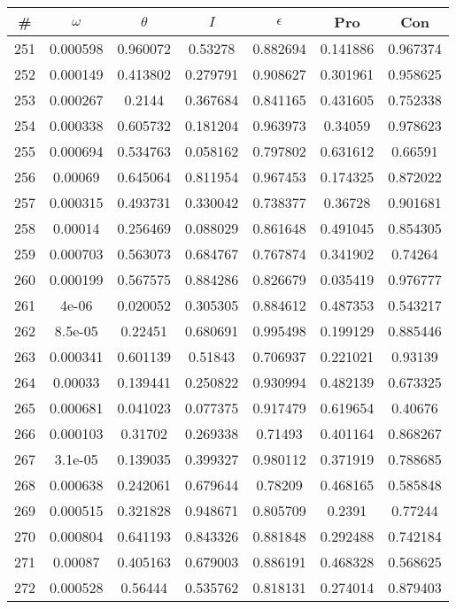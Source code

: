 \newpage
\begin{table}
\begin{tabular}{c|c|c|c|c|c|c}
\# & $\omega$ & $\theta$ & $I$ & $\epsilon$ & Pro & Con\\
\hline
251 & 0.000598 & 0.960072 & 0.53278 & 0.882694 & 0.141886 & 0.967374\\
252 & 0.000149 & 0.413802 & 0.279791 & 0.908627 & 0.301961 & 0.958625\\
253 & 0.000267 & 0.2144 & 0.367684 & 0.841165 & 0.431605 & 0.752338\\
254 & 0.000338 & 0.605732 & 0.181204 & 0.963973 & 0.34059 & 0.978623\\
255 & 0.000694 & 0.534763 & 0.058162 & 0.797802 & 0.631612 & 0.66591\\
256 & 0.00069 & 0.645064 & 0.811954 & 0.967453 & 0.174325 & 0.872022\\
257 & 0.000315 & 0.493731 & 0.330042 & 0.738377 & 0.36728 & 0.901681\\
258 & 0.00014 & 0.256469 & 0.088029 & 0.861648 & 0.491045 & 0.854305\\
259 & 0.000703 & 0.563073 & 0.684767 & 0.767874 & 0.341902 & 0.74264\\
260 & 0.000199 & 0.567575 & 0.884286 & 0.826679 & 0.035419 & 0.976777\\
261 & 4e-06 & 0.020052 & 0.305305 & 0.884612 & 0.487353 & 0.543217\\
262 & 8.5e-05 & 0.22451 & 0.680691 & 0.995498 & 0.199129 & 0.885446\\
263 & 0.000341 & 0.601139 & 0.51843 & 0.706937 & 0.221021 & 0.93139\\
264 & 0.00033 & 0.139441 & 0.250822 & 0.930994 & 0.482139 & 0.673325\\
265 & 0.000681 & 0.041023 & 0.077375 & 0.917479 & 0.619654 & 0.40676\\
266 & 0.000103 & 0.31702 & 0.269338 & 0.71493 & 0.401164 & 0.868267\\
267 & 3.1e-05 & 0.139035 & 0.399327 & 0.980112 & 0.371919 & 0.788685\\
268 & 0.000638 & 0.242061 & 0.679644 & 0.78209 & 0.468165 & 0.585848\\
269 & 0.000515 & 0.321828 & 0.948671 & 0.805709 & 0.2391 & 0.77244\\
270 & 0.000804 & 0.641193 & 0.843326 & 0.881848 & 0.292488 & 0.742184\\
271 & 0.00087 & 0.405163 & 0.679003 & 0.886191 & 0.468328 & 0.568625\\
272 & 0.000528 & 0.56444 & 0.535762 & 0.818131 & 0.274014 & 0.879403\\

\end{tabular}
\end{table}
